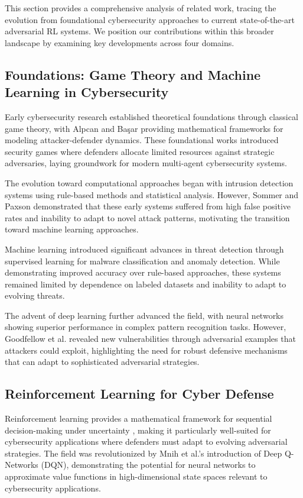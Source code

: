 \documentclass[12pt,oneside]{article}
\begin{document}
This section provides a comprehensive analysis of related work, tracing the evolution from foundational cybersecurity approaches to current state-of-the-art adversarial RL systems. We position our contributions within this broader landscape by examining key developments across four domains.

\subsection{Foundations: Game Theory and Machine Learning in Cybersecurity}

Early cybersecurity research established theoretical foundations through classical game theory, with Alpcan and Başar \cite{alpcan2010network} providing mathematical frameworks for modeling attacker-defender dynamics. These foundational works introduced security games where defenders allocate limited resources against strategic adversaries, laying groundwork for modern multi-agent cybersecurity systems.

The evolution toward computational approaches began with intrusion detection systems using rule-based methods and statistical analysis. However, Sommer and Paxson \cite{sommer2010outside} demonstrated that these early systems suffered from high false positive rates and inability to adapt to novel attack patterns, motivating the transition toward machine learning approaches.

Machine learning introduced significant advances in threat detection through supervised learning for malware classification and anomaly detection. While demonstrating improved accuracy over rule-based approaches, these systems remained limited by dependence on labeled datasets and inability to adapt to evolving threats.

The advent of deep learning further advanced the field, with neural networks showing superior performance in complex pattern recognition tasks. However, Goodfellow et al. \cite{goodfellow2014explaining} revealed new vulnerabilities through adversarial examples that attackers could exploit, highlighting the need for robust defensive mechanisms that can adapt to sophisticated adversarial strategies.

\subsection{Reinforcement Learning for Cyber Defense}

Reinforcement learning provides a mathematical framework for sequential decision-making under uncertainty \cite{sutton2018reinforcement}, making it particularly well-suited for cybersecurity applications where defenders must adapt to evolving adversarial strategies. The field was revolutionized by Mnih et al.'s \cite{mnih2015human} introduction of Deep Q-Networks (DQN), demonstrating the potential for neural networks to approximate value functions in high-dimensional state spaces relevant to cybersecurity applications.
\end{document}
